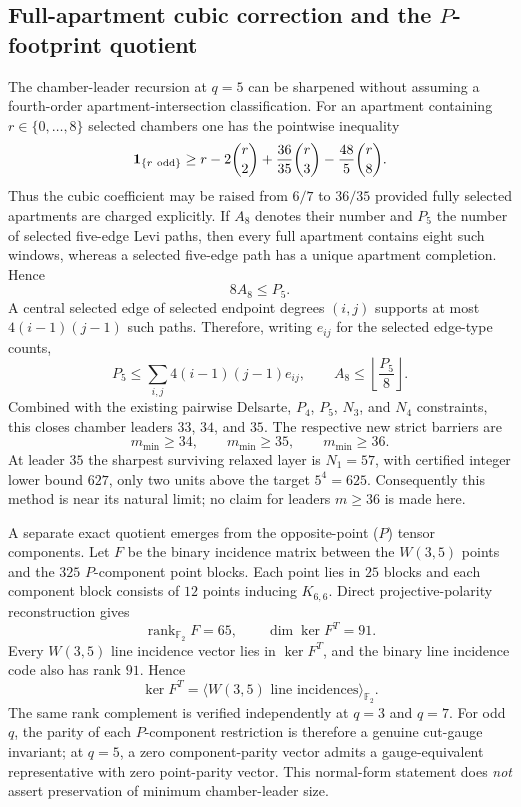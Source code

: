 \subsection{Full-apartment cubic correction and the $P$-footprint quotient}
\label{sec:pass5198_5203_q5_footprint}

The chamber-leader recursion at $q=5$ can be sharpened without assuming a
fourth-order apartment-intersection classification.  For an apartment containing
$r\in\{0,\ldots,8\}$ selected chambers one has the pointwise inequality
\[
 {\bf 1}_{\{r\ \mathrm{odd}\}}
 \ge r-2\binom r2+\frac{36}{35}\binom r3-\frac{48}{5}\binom r8.
\]
Thus the cubic coefficient may be raised from $6/7$ to $36/35$ provided fully
selected apartments are charged explicitly.  If $A_8$ denotes their number and
$P_5$ the number of selected five-edge Levi paths, then every full apartment
contains eight such windows, whereas a selected five-edge path has a unique
apartment completion.  Hence
\[
 8A_8\le P_5.
\]
A central selected edge of selected endpoint degrees $(i,j)$ supports at most
$4(i-1)(j-1)$ such paths.  Therefore, writing $e_{ij}$ for the selected
edge-type counts,
\[
 P_5\le\sum_{i,j}4(i-1)(j-1)e_{ij},
 \qquad
 A_8\le\left\lfloor\frac{P_5}{8}\right\rfloor.
\]
Combined with the existing pairwise Delsarte, $P_4$, $P_5$, $N_3$, and $N_4$
constraints, this closes chamber leaders $33$, $34$, and $35$.  The respective
new strict barriers are
\[
 \boxed{m_{\min}\ge34},\qquad
 \boxed{m_{\min}\ge35},\qquad
 \boxed{m_{\min}\ge36}.
\]
At leader $35$ the sharpest surviving relaxed layer is $N_1=57$, with certified
integer lower bound $627$, only two units above the target $5^4=625$.
Consequently this method is near its natural limit; no claim for leaders
$m\ge36$ is made here.

A separate exact quotient emerges from the opposite-point ($P$) tensor
components.  Let $F$ be the binary incidence matrix between the
$W(3,5)$ points and the $325$ $P$-component point blocks.  Each point lies in
$25$ blocks and each component block consists of $12$ points inducing
$K_{6,6}$.  Direct projective-polarity reconstruction gives
\[
 \operatorname{rank}_{\mathbb F_2}F=65,
 \qquad
 \dim\ker F^{T}=91.
\]
Every $W(3,5)$ line incidence vector lies in $\ker F^T$, and the binary line
incidence code also has rank $91$.  Hence
\[
 \boxed{\ker F^T=\langle\text{$W(3,5)$ line incidences}\rangle_{\mathbb F_2}}.
\]
The same rank complement is verified independently at $q=3$ and $q=7$.
For odd $q$, the parity of each $P$-component restriction is therefore a genuine
cut-gauge invariant; at $q=5$, a zero component-parity vector admits a
gauge-equivalent representative with zero point-parity vector.  This normal-form
statement does \emph{not} assert preservation of minimum chamber-leader size.

